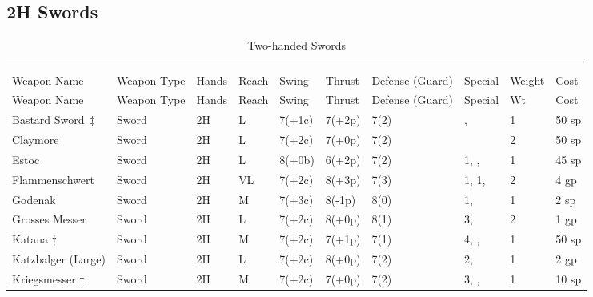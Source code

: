 \documentclass[oneside,11pt,english]{book}
\begin{document}
\subsection{2H Swords}\vspace{-15pt}
\begin{longtabu} to 1\linewidth {X[2,l]XX[-1,c]X[-1,c]XXX[-1,c]X[2,l]X[-3,c]X[-3,r]}
  \captionsetup{labelformat=blank,textformat=empty}
  \caption{Two-handed Swords}\vspace{-15pt}\\
  \label{tab:2H Swords}\\
  Weapon Name						&Weapon Type	&Hands&Reach&Swing&Thrust&Defense (Guard)&Special						&Weight	&Cost\\\toprule\endfirsthead
  Weapon Name					&Weapon Type	&Hands	&Reach	&Swing	&Thrust	&Defense (Guard)	&Special						&Wt		&Cost\\\toprule\endhead
  {Bastard Sword\ \hyperref[wep:bastard-sword-1h]{$ \ddagger $}\label{wep:bastard-sword-2h}}				&Sword			&2H		&L		&7(+1c)	&7(+2p)	&7(2)				&,  			&1		&50 sp\\
  Claymore					&Sword			&2H		&L		&7(+2c)	&7(+0p)	&7(2)	& &2 &50 sp\\
  Estoc						&Sword 			&2H		&L		&8(+0b)	&6(+2p)	&7(2)	& 1, , 			&1		&45 sp\\
  Flammenschwert				&Sword			&2H		&VL		&7(+2c)	&8(+3p)	&7(3)	& 1,  1, 				&2		&4 gp\\
  Godenak &Sword &2H &M &7(+3c) &8(-1p) &8(0) & 1,  &1 &2 sp\\
  Grosses Messer &Sword &2H &L &7(+2c) &8(+0p) &8(1) & 3,  &2 &1 gp\\
  {Katana \hyperref[wep:katana-1h]{$ \ddagger $} \label{wep:katana-2h}} &Sword &2H &M 	&7(+2c) &7(+1p) &7(1) & 4, ,  			&1 	&50 sp\\
  Katzbalger (Large) 		&Sword &2H &L 	&7(+2c) &8(+0p) &7(2) & 2,  				&1 	&2 gp \\
  {Kriegsmesser \hyperref[wep:kriegsmesser-1h]{$\ddagger $}	\label{wep:kriegsmesser-2h}}		&Sword &2H &M 	&7(+2c) &7(+0p) &7(2) & 3, ,  			&1 	&10 sp\\

\end{longtabu}
\end{document}
